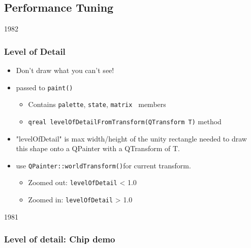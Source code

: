 %
%
%
%

\subsection{Performance Tuning}



\begin{slide}[fragile]{1982}

\frametitle{Level of Detail}
\begin{itemize}
\item Don't draw what you can't see!
\item {} passed to \texttt{paint()}

    \begin{itemize}
    \item Contains \texttt{palette}, \texttt{state}, \texttt{matrix
    } members
    \item \texttt{qreal levelOfDetailFromTransform(QTransform T)} method   
    \end{itemize}
\item "levelOfDetail" is max width/height of the unity rectangle
needed to draw this shape onto a QPainter with a QTransform of T.
\item use \texttt{QPainter::worldTransform()}for current transform.
    \begin{itemize}
\begin{cpp}
double levelOfDetail = 
levelOfDetailFromTransform(painter->worldTransform());
\end{cpp}
    \item Zoomed out: \texttt{levelOfDetail} < 1.0
    \item Zoomed in: \texttt{levelOfDetail} > 1.0
    \end{itemize}
\end{itemize}
\end{slide}

\begin{slide}[fragile]{1981}


\frametitle{Level of detail: Chip demo}

\end{slide}


